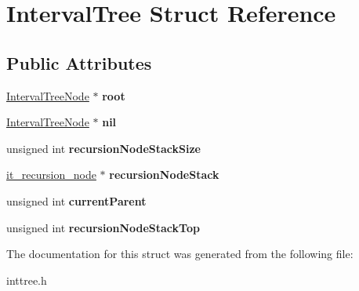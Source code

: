 \hypertarget{struct_interval_tree}{\section{Interval\-Tree Struct Reference}
\label{struct_interval_tree}
}
\subsection*{Public Attributes}
\begin{DoxyCompactItemize}
\item 
\hypertarget{struct_interval_tree_a1266823c484d2290d3a936fbd1a74aaa}{\hyperlink{struct_interval_tree_node}{Interval\-Tree\-Node} $\ast$ {\bfseries root}}\label{struct_interval_tree_a1266823c484d2290d3a936fbd1a74aaa}

\item 
\hypertarget{struct_interval_tree_a5804c0899a6ee99f9c11144b87a5a649}{\hyperlink{struct_interval_tree_node}{Interval\-Tree\-Node} $\ast$ {\bfseries nil}}\label{struct_interval_tree_a5804c0899a6ee99f9c11144b87a5a649}

\item 
\hypertarget{struct_interval_tree_a0917c6e1081993d812512b74fc78bea8}{unsigned int {\bfseries recursion\-Node\-Stack\-Size}}\label{struct_interval_tree_a0917c6e1081993d812512b74fc78bea8}

\item 
\hypertarget{struct_interval_tree_a13e7c2ebb4d6aa597781c4ab6bb9f23f}{\hyperlink{structit__recursion__node}{it\-\_\-recursion\-\_\-node} $\ast$ {\bfseries recursion\-Node\-Stack}}\label{struct_interval_tree_a13e7c2ebb4d6aa597781c4ab6bb9f23f}

\item 
\hypertarget{struct_interval_tree_a3fd01a4afdf3bd2f7be480b6ceff53c5}{unsigned int {\bfseries current\-Parent}}\label{struct_interval_tree_a3fd01a4afdf3bd2f7be480b6ceff53c5}

\item 
\hypertarget{struct_interval_tree_a19b22cbbd404bad869ece2c2931221f7}{unsigned int {\bfseries recursion\-Node\-Stack\-Top}}\label{struct_interval_tree_a19b22cbbd404bad869ece2c2931221f7}

\end{DoxyCompactItemize}


The documentation for this struct was generated from the following file\-:\begin{DoxyCompactItemize}
\item 
inttree.\-h\end{DoxyCompactItemize}
